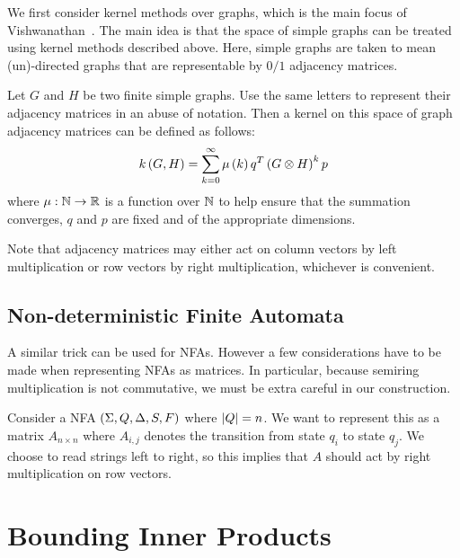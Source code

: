 \documentclass[12pt]{article}
\begin{document}
We first consider kernel methods over graphs, which is the main focus
of Vishwanathan~\cite{vishwanathan2010graph}.
The main idea is that the space of simple graphs can be treated
using kernel methods described above.
Here, simple graphs are taken to mean (un)-directed graphs
that are representable by \(0 / 1\) adjacency matrices.

Let \(G\) and \(H\) be two finite simple graphs.
Use the same letters to represent their adjacency matrices in an abuse
of notation.
Then a kernel on this space of graph adjacency matrices can be
defined as follows:
\begin{align*}
  k\left(G, H\right)
    = \sum_{k = 0}^{\infty} \mu\left(k\right) q^T \left(G \otimes H\right)^k p
\end{align*}
where \(\mu : \mathbb{N} \to \mathbb{R}\) is a function over \(\mathbb{N}\)
to help ensure that the summation converges,
\(q\) and \(p\) are fixed and of the appropriate dimensions.

Note that adjacency matrices may either act on column vectors by
left multiplication or row vectors by right multiplication,
whichever is convenient.


\subsection{Non-deterministic Finite Automata}
A similar trick can be used for NFAs.
However a few considerations have to be made when representing NFAs
as matrices.
In particular, because semiring multiplication is not commutative,
we must be extra careful in our construction.

Consider a NFA \(\left(\Sigma, Q, \Delta, S, F\right)\)
where \(\left\lvert Q\right\rvert = n\).
We want to represent this as a matrix \(A_{n \times n}\)
where \(A_{i, j}\) denotes the transition from state \(q_i\)
to state \(q_j\).
We choose to read strings left to right, so this implies that
\(A\) should act by right multiplication on row vectors.



\section{Bounding Inner Products}




\printbibliography
\end{document}
